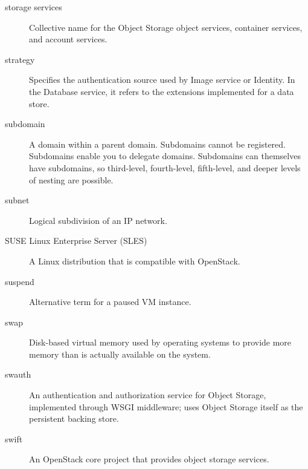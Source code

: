 \documentclass[letterpaper,10pt,english]{sphinxmanual}
\begin{document}
\begin{description}
\item[{storage services}] \leavevmode{}\label{_source/glossary:term-storage-services}
Collective name for the Object Storage object services,
container services, and account services.

\item[{strategy}] \leavevmode{}\label{_source/glossary:term-strategy}
Specifies the authentication source used by Image service or
Identity. In the Database service, it refers to the extensions
implemented for a data store.

\item[{subdomain}] \leavevmode{}\label{_source/glossary:term-subdomain}
A domain within a parent domain. Subdomains cannot be
registered. Subdomains enable you to delegate domains. Subdomains can
themselves have subdomains, so third-level, fourth-level, fifth-level,
and deeper levels of nesting are possible.

\item[{subnet}] \leavevmode{}\label{_source/glossary:term-subnet}
Logical subdivision of an IP network.

\item[{SUSE Linux Enterprise Server (SLES)}] \leavevmode{}\label{_source/glossary:term-suse-linux-enterprise-server-sles}
A Linux distribution that is compatible with OpenStack.

\item[{suspend}] \leavevmode{}\label{_source/glossary:term-suspend}
Alternative term for a paused VM instance.

\item[{swap}] \leavevmode{}\label{_source/glossary:term-swap}
Disk-based virtual memory used by operating systems to provide
more memory than is actually available on the system.

\item[{swauth}] \leavevmode{}\label{_source/glossary:term-swauth}
An authentication and authorization service for Object Storage,
implemented through WSGI middleware; uses Object Storage itself as the
persistent backing store.

\item[{swift}] \leavevmode{}\label{_source/glossary:term-swift}
An OpenStack core project that provides object storage
services.


\end{description}
\end{document}

